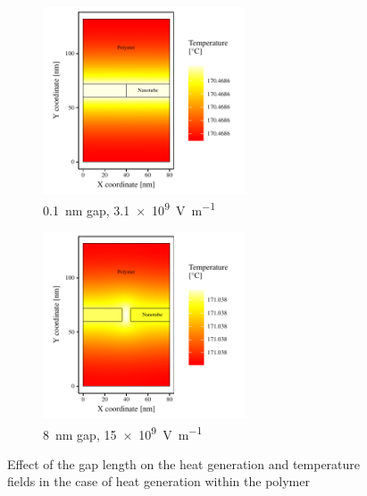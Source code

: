 \documentclass[11pt,review,times]{elsarticle}
\begin{document}
\begin{figure}[htb]
	\begin{subfigure}{60mm}
		\centering
		\captionsetup{width=55mm}
		\includegraphics[width=60mm]{resultats_0,1nm_comsol_2D_temp}
		\caption{\SI{0.1}{\nano\metre} gap, \SI{3.1e9}{\volt\per\metre}}
		\label{fig:result_gap01nm_temp}		
	\end{subfigure} 
	\begin{subfigure}{60mm}
		\centering
		\captionsetup{width=55mm}
		\includegraphics[width=60mm]{resultats_8nm_comsol_2D_temp}
		\caption{\SI{8}{\nano\metre} gap, \SI{15e9}{\volt\per\metre}}
		\label{fig:result_gap8nm_temp}		
	\end{subfigure}
	\caption{Effect of the gap length on the heat generation and temperature fields in the case of heat generation within the polymer}
	\label{fig:result_gap}
\end{figure}
\end{document}
